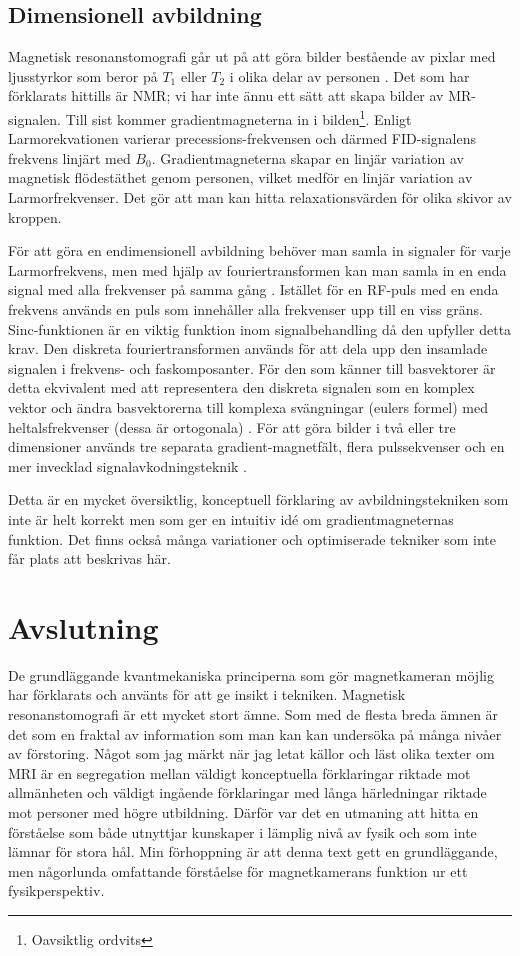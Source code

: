 \documentclass[11pt, a4paper]{article}
\begin{document}
\subsection{Dimensionell avbildning}
Magnetisk resonanstomografi går ut på att göra bilder bestående av pixlar med ljusstyrkor som beror på $T_1$ eller $T_2$ i olika delar av personen \parencite{understanding_mri}. Det som har förklarats hittills är NMR; vi har inte ännu ett sätt att skapa bilder av MR-signalen. Till sist kommer gradientmagneterna in i bilden\footnote{Oavsiktlig ordvits}. Enligt Larmorekvationen varierar precessions-frekvensen och därmed FID-signalens frekvens linjärt med $B_0$. Gradientmagneterna skapar en linjär variation av magnetisk flödestäthet genom personen, vilket medför en linjär variation av Larmorfrekvenser. Det gör att man kan hitta relaxationsvärden för olika skivor av kroppen. 

För att göra en endimensionell avbildning behöver man samla in signaler för varje Larmorfrekvens, men med hjälp av fouriertransformen kan man samla in en enda signal med alla frekvenser på samma gång \parencite{mri_lärobok}. Istället för en RF-puls med en enda frekvens används en puls som innehåller alla frekvenser upp till en viss gräns. Sinc-funktionen är en viktig funktion inom signalbehandling då den upfyller detta krav. Den diskreta fouriertransformen används för att dela upp den insamlade signalen i frekvens- och faskomposanter. För den som känner till basvektorer är detta ekvivalent med att representera den diskreta signalen som en komplex vektor och ändra basvektorerna till komplexa svängningar (eulers formel) med heltalsfrekvenser (dessa är ortogonala) \parencite{dsp_bok_kapitel}. För att göra bilder i två eller tre dimensioner används tre separata gradient-magnetfält, flera pulssekvenser och en mer invecklad signalavkodningsteknik \parencite{mri_lärobok}. 

Detta är en mycket översiktlig, konceptuell förklaring av avbildningstekniken som inte är helt korrekt men som ger en intuitiv idé om gradientmagneternas funktion. Det finns också många variationer och optimiserade tekniker som inte får plats att beskrivas här.

\clearpage
\section{Avslutning}
De grundläggande kvantmekaniska principerna som gör magnetkameran möjlig har förklarats och använts för att ge insikt i tekniken. Magnetisk resonanstomografi är ett mycket stort ämne. Som med de flesta breda ämnen är det som en fraktal av information som man kan kan undersöka på många nivåer av förstoring. Något som jag märkt när jag letat källor och läst olika texter om MRI är en segregation mellan väldigt konceptuella förklaringar riktade mot allmänheten och väldigt ingående förklaringar med långa härledningar riktade mot personer med högre utbildning. Därför var det en utmaning att hitta en förståelse som både utnyttjar kunskaper i lämplig nivå av fysik och som inte lämnar för stora hål.  Min förhoppning är att denna text gett en grundläggande, men någorlunda omfattande förståelse för magnetkamerans funktion ur ett fysikperspektiv.


\clearpage
\printbibliography
\end{document}
